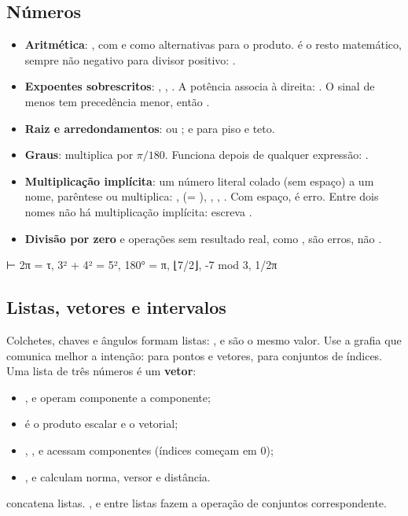 \subsection{Números}\label{sec:numeros}
\begin{itemize}
  \item \textbf{Aritmética}: , com \code{*} e  como alternativas para o produto.  é o resto matemático, sempre não negativo para divisor positivo: .
  \item \textbf{Expoentes sobrescritos}: , , . A potência associa à direita: . O sinal de menos tem precedência menor, então .
  \item \textbf{Raiz e arredondamentos}:  ou ;  e  para piso e teto.
  \item \textbf{Graus}:  multiplica por $\pi/180$. Funciona depois de qualquer expressão: .
  \item \textbf{Multiplicação implícita}: um número literal colado (sem espaço) a um nome, parêntese ou  multiplica:
    ,  (= ), , , . Com espaço,  é erro.
    Entre dois nomes não há multiplicação implícita: escreva .
  \item \textbf{Divisão por zero} e operações sem resultado real, como , são erros, não .
\end{itemize}
\begin{csg}[run]
⊢ 2π = τ, 3² + 4² = 5², 180° = π, ⌊7/2⌋, -7 mod 3, 1/2π
\end{csg}

\subsection{Listas, vetores e intervalos}
Colchetes, chaves e ângulos formam listas: \code{[a, b]},  e  são o mesmo valor.
Use a grafia que comunica melhor a intenção:  para pontos e vetores,  para conjuntos de índices.
Uma lista de três números é um \textbf{vetor}:
\begin{itemize}
  \item {},  e  operam componente a componente;
  \item {} é o produto escalar e  o vetorial;
  \item {}, ,  e  acessam componentes (índices começam em 0);
  \item {},  e  calculam norma, versor e distância.
\end{itemize}
 concatena listas. ,  e  entre listas fazem a operação de conjuntos correspondente.

